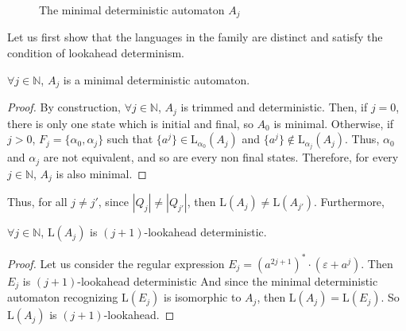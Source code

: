 \documentclass{llncs}
\begin{document}
\begin{figure}[H]
	\centering
	
	
	\caption{The minimal deterministic automaton $A_j$}
	\label{fg:Aj}
\end{figure}	

Let us first show that the languages in the family are distinct and satisfy the condition of lookahead determinism.

\begin{proposition}
	$\forall j \in \mathbb{N}$, $A_j$ is a minimal deterministic automaton.
\end{proposition}
\begin{proof}
	By construction, $\forall j \in \mathbb{N}$, $A_j$ is trimmed and deterministic.
	Then, if $j = 0$, there is only one state which is initial and final, so $A_0$ is minimal.
	Otherwise, if $j > 0$, $F_j = \{\alpha_0, \alpha_j\}$ such that $\{a^j\} \in \mathrm{L}_{\alpha_0}(A_j)$ and $\{a^j\} \notin \mathrm{L}_{\alpha_j}(A_j)$.
	Thus, $\alpha_0$ and $\alpha_j$ are not equivalent, and so are every non final states.
	Therefore, for every $j \in \mathbb{N}$, $A_j$ is also minimal.
\end{proof}

Thus, for all $j \neq j'$, since $|Q_j| \neq |Q_{j'}|$, then $\mathrm{L}(A_j) \neq \mathrm{L}(A_{j'})$.
Furthermore,

\begin{proposition}\label{prop:Aj_jp1_ld}
	$\forall j \in \mathbb{N}$, $\mathrm{L}(A_j)$ is $(j+1)$-lookahead deterministic.
\end{proposition}
\begin{proof}
	Let us consider the regular expression $E_j = (a^{2j+1})^* \cdot (\varepsilon + a^j)$.
	Then $E_j$ is $(j+1)$-lookahead deterministic
	And since the minimal deterministic automaton recognizing $\mathrm{L}(E_j)$ is isomorphic to $A_j$, then $\mathrm{L}(A_j) = \mathrm{L}(E_j)$.
	So $\mathrm{L}(A_j)$ is $(j+1)$-lookahead.
\end{proof}
\end{document}
